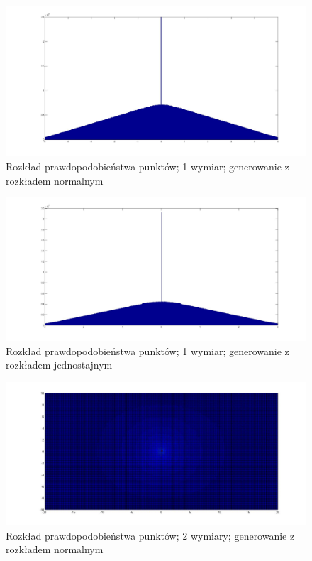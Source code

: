 \documentclass{mini}
\begin{document}
\begin{figure}[H]
\centering
\includegraphics[width=\textwidth]{ri_n_20M_1__5_5}
\caption{Rozkład prawdopodobieństwa punktów; 1 wymiar; generowanie z rozkładem normalnym}
\end{figure}

\begin{figure}[H]
\centering
\includegraphics[width=\textwidth]{ri_j_20M_1__3_3}
\caption{Rozkład prawdopodobieństwa punktów; 1 wymiar; generowanie z rozkładem jednostajnym}
\label{bladzenie:reinicjacja1dj}
\end{figure}

\begin{figure}[H]
\centering
\includegraphics[width=\textwidth]{ri_n_10M_2__20_20__10_10_4}
\caption{Rozkład prawdopodobieństwa punktów; 2 wymiary; generowanie z rozkładem normalnym}
\end{figure}
\end{document}
